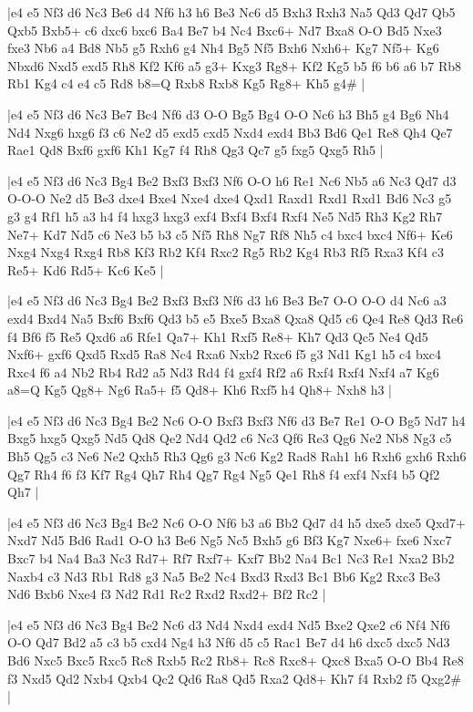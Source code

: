 \whitename{}
\blackname{}
\makegametitle
|e4 e5 Nf3 d6 Nc3 Be6 d4 Nf6 h3 h6 Be3 Nc6 d5 Bxh3 Rxh3 Na5 Qd3 Qd7 Qb5 Qxb5 Bxb5+ c6 dxc6 bxc6 Ba4 Be7 b4 Nc4 Bxc6+ Nd7 Bxa8 O-O Bd5 Nxe3 fxe3 Nb6 a4 Bd8 Nb5 g5 Rxh6 g4 Nh4 Bg5 Nf5 Bxh6 Nxh6+ Kg7 Nf5+ Kg6 Nbxd6 Nxd5 exd5 Rh8 Kf2 Kf6 a5 g3+ Kxg3 Rg8+ Kf2 Kg5 b5 f6 b6 a6 b7 Rb8 Rb1 Kg4 c4 e4 c5 Rd8 b8=Q Rxb8 Rxb8 Kg5 Rg8+ Kh5 g4\#  |

\whitename{}
\blackname{}
\makegametitle
|e4 e5 Nf3 d6 Nc3 Be7 Bc4 Nf6 d3 O-O Bg5 Bg4 O-O Nc6 h3 Bh5 g4 Bg6 Nh4 Nd4 Nxg6 hxg6 f3 c6 Ne2 d5 exd5 cxd5 Nxd4 exd4 Bb3 Bd6 Qe1 Re8 Qh4 Qe7 Rae1 Qd8 Bxf6 gxf6 Kh1 Kg7 f4 Rh8 Qg3 Qc7 g5 fxg5 Qxg5 Rh5  |

\whitename{}
\blackname{}
\makegametitle
|e4 e5 Nf3 d6 Nc3 Bg4 Be2 Bxf3 Bxf3 Nf6 O-O h6 Re1 Nc6 Nb5 a6 Nc3 Qd7 d3 O-O-O Ne2 d5 Be3 dxe4 Bxe4 Nxe4 dxe4 Qxd1 Raxd1 Rxd1 Rxd1 Bd6 Nc3 g5 g3 g4 Rf1 h5 a3 h4 f4 hxg3 hxg3 exf4 Bxf4 Bxf4 Rxf4 Ne5 Nd5 Rh3 Kg2 Rh7 Ne7+ Kd7 Nd5 c6 Ne3 b5 b3 c5 Nf5 Rh8 Ng7 Rf8 Nh5 c4 bxc4 bxc4 Nf6+ Ke6 Nxg4 Nxg4 Rxg4 Rb8 Kf3 Rb2 Kf4 Rxc2 Rg5 Rb2 Kg4 Rb3 Rf5 Rxa3 Kf4 c3 Re5+ Kd6 Rd5+ Kc6 Ke5  |

\whitename{}
\blackname{}
\makegametitle
|e4 e5 Nf3 d6 Nc3 Bg4 Be2 Bxf3 Bxf3 Nf6 d3 h6 Be3 Be7 O-O O-O d4 Nc6 a3 exd4 Bxd4 Na5 Bxf6 Bxf6 Qd3 b5 e5 Bxe5 Bxa8 Qxa8 Qd5 c6 Qe4 Re8 Qd3 Re6 f4 Bf6 f5 Re5 Qxd6 a6 Rfe1 Qa7+ Kh1 Rxf5 Re8+ Kh7 Qd3 Qc5 Ne4 Qd5 Nxf6+ gxf6 Qxd5 Rxd5 Ra8 Nc4 Rxa6 Nxb2 Rxc6 f5 g3 Nd1 Kg1 h5 c4 bxc4 Rxc4 f6 a4 Nb2 Rb4 Rd2 a5 Nd3 Rd4 f4 gxf4 Rf2 a6 Rxf4 Rxf4 Nxf4 a7 Kg6 a8=Q Kg5 Qg8+ Ng6 Ra5+ f5 Qd8+ Kh6 Rxf5 h4 Qh8+ Nxh8 h3  |

\whitename{}
\blackname{}
\makegametitle
|e4 e5 Nf3 d6 Nc3 Bg4 Be2 Nc6 O-O Bxf3 Bxf3 Nf6 d3 Be7 Re1 O-O Bg5 Nd7 h4 Bxg5 hxg5 Qxg5 Nd5 Qd8 Qe2 Nd4 Qd2 c6 Nc3 Qf6 Re3 Qg6 Ne2 Nb8 Ng3 c5 Bh5 Qg5 c3 Ne6 Ne2 Qxh5 Rh3 Qg6 g3 Nc6 Kg2 Rad8 Rah1 h6 Rxh6 gxh6 Rxh6 Qg7 Rh4 f6 f3 Kf7 Rg4 Qh7 Rh4 Qg7 Rg4 Ng5 Qe1 Rh8 f4 exf4 Nxf4 b5 Qf2 Qh7  |

\whitename{}
\blackname{}
\makegametitle
|e4 e5 Nf3 d6 Nc3 Bg4 Be2 Nc6 O-O Nf6 b3 a6 Bb2 Qd7 d4 h5 dxe5 dxe5 Qxd7+ Nxd7 Nd5 Bd6 Rad1 O-O h3 Be6 Ng5 Nc5 Bxh5 g6 Bf3 Kg7 Nxe6+ fxe6 Nxc7 Bxc7 b4 Na4 Ba3 Nc3 Rd7+ Rf7 Rxf7+ Kxf7 Bb2 Na4 Bc1 Nc3 Re1 Nxa2 Bb2 Naxb4 c3 Nd3 Rb1 Rd8 g3 Na5 Be2 Nc4 Bxd3 Rxd3 Bc1 Bb6 Kg2 Rxc3 Be3 Nd6 Bxb6 Nxe4 f3 Nd2 Rd1 Rc2 Rxd2 Rxd2+ Bf2 Rc2  |

\whitename{}
\blackname{}
\makegametitle
|e4 e5 Nf3 d6 Nc3 Bg4 Be2 Nc6 d3 Nd4 Nxd4 exd4 Nd5 Bxe2 Qxe2 c6 Nf4 Nf6 O-O Qd7 Bd2 a5 c3 b5 cxd4 Ng4 h3 Nf6 d5 c5 Rac1 Be7 d4 h6 dxc5 dxc5 Nd3 Bd6 Nxc5 Bxc5 Rxc5 Rc8 Rxb5 Rc2 Rb8+ Rc8 Rxc8+ Qxc8 Bxa5 O-O Bb4 Re8 f3 Nxd5 Qd2 Nxb4 Qxb4 Qc2 Qd6 Ra8 Qd5 Rxa2 Qd8+ Kh7 f4 Rxb2 f5 Qxg2\#  |

